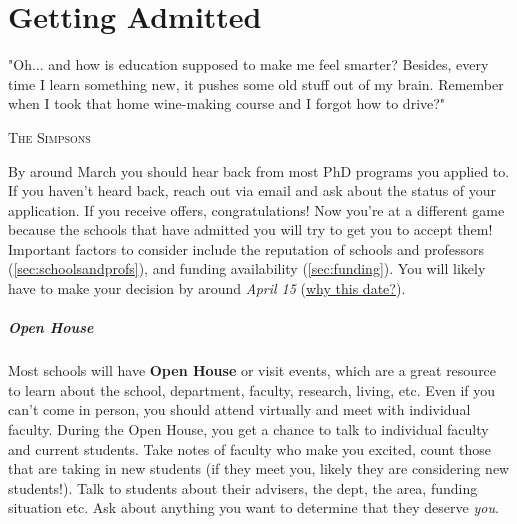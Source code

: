 \documentclass[oneside,11pt,dvipsnames]{book}
\begin{document}



%


\chapter{Getting Admitted}\label{sec:accepted}

\epigraph{"Oh... and how is education supposed to make me feel smarter? Besides, every time I learn something new, it pushes some old stuff out of my brain. Remember when I took that home wine-making course and I forgot how to drive?"}{\textsc{The Simpsons}}

By around March you should hear back from most PhD programs you applied to. If you haven't heard back, reach out via email and ask about the status of your application.
If you receive offers, congratulations!  Now you're at a different game because the schools that have admitted you will try to get you to accept them!  Important factors to consider include the reputation of schools and professors (\autoref{sec:schoolsandprofs}), and funding availability (\autoref{sec:funding}). You will likely have to make your decision by around \emph{April 15} (\href{https://cgsnet.org/wp-content/uploads/2024/01/CGS_April15_Resolution_Jan312024.pdf}{why this date?}).

\paragraph{Open House} Most schools will have \textbf{Open House} or visit events, which are a great resource to learn about the school, department, faculty, research, living, etc. Even if you can't come in person, you should attend virtually and meet with individual faculty.
During the Open House, you get a chance to talk to individual faculty and current students.  Take notes of faculty who make you excited, count those that are taking in new students (if they meet you, likely they are considering new students!).  Talk to students about their advisers, the dept, the area, funding situation etc.  Ask about anything you want to determine that they deserve \emph{you}.
\end{document}
